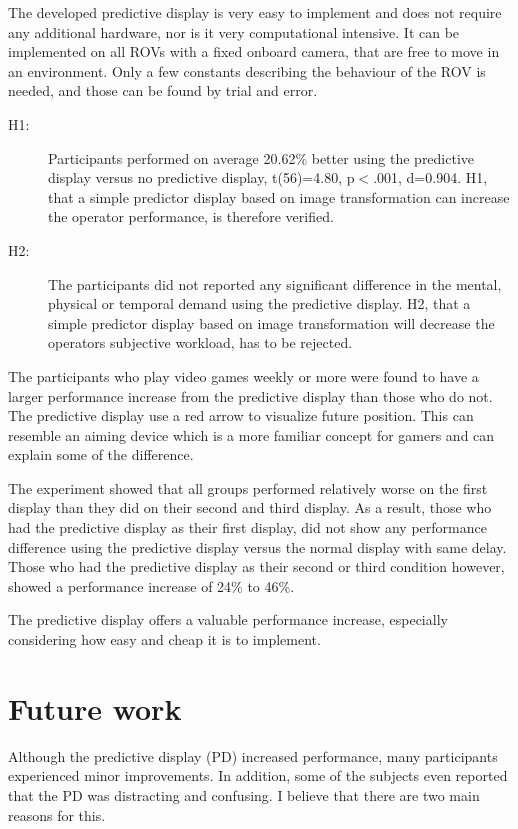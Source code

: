 The developed predictive display is very easy to implement and does not require any additional hardware, nor is it very computational intensive. It can be implemented on all ROVs with a fixed onboard camera, that are free to move in an environment. Only a few constants describing the behaviour of the ROV is needed, and those can be found by trial and error.

\begin{description}
\item[H1:] Participants performed on average 20.62\% better using the predictive display versus no predictive display, t(56)=4.80, p$<$.001, d=0.904. H1, that a simple predictor display based on image transformation can increase the operator performance, is therefore verified.

\item[H2:] The participants did not reported any significant difference in the mental, physical or temporal demand using the predictive display. H2, that a simple predictor display based on image transformation will decrease the operators subjective workload, has to be rejected. 
\end{description}

The participants who play video games weekly or more were found to have a larger performance increase from the predictive display than those who do not. The predictive display use a red arrow to visualize future position. This can resemble an aiming device which is a more familiar concept for gamers and can explain some of the difference.

The experiment showed that all groups performed relatively worse on the first display than they did on their second and third display. As a result, those who had the predictive display as their first display, did not show any performance difference using the predictive display versus the normal display with same delay. Those who had the predictive display as their second or third condition however, showed a performance increase of 24\% to 46\%.

The predictive display offers a valuable performance increase, especially considering how easy and cheap it is to implement.

\section{Future work}

Although the predictive display (PD) increased performance, many participants experienced minor improvements. In addition, some of the subjects even reported that the PD was distracting and confusing. I believe that there are two main reasons for this.

